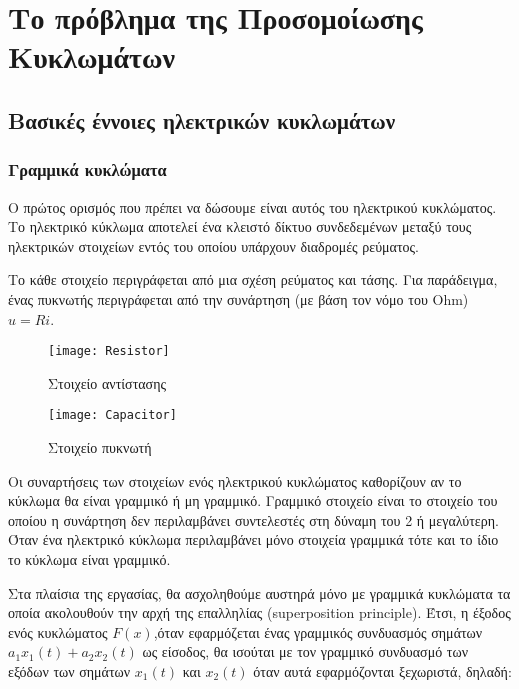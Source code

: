 ﻿
\chapter{Το πρόβλημα της Προσομοίωσης Κυκλωμάτων}
\label{ch:2.chapterCircuitSimulationPrinciples}
    
\section{Βασικές έννοιες ηλεκτρικών κυκλωμάτων}

\subsection{Γραμμικά κυκλώματα}

Ο πρώτος ορισμός που πρέπει να δώσουμε είναι αυτός του ηλεκτρικού κυκλώματος. Το ηλεκτρικό κύκλωμα αποτελεί ένα κλειστό δίκτυο συνδεδεμένων μεταξύ τους ηλεκτρικών στοιχείων εντός του οποίου υπάρχουν διαδρομές ρεύματος.

Το κάθε στοιχείο περιγράφεται από μια σχέση ρεύματος και τάσης. Για παράδειγμα, ένας πυκνωτής περιγράφεται από την συνάρτηση (με βάση τον νόμο του \textlatin{Ohm}) $u = Ri$.

\begin{figure}
    \centering
    \begin{minipage}{0.45\textwidth}
        \centering
        \texttt{[image: Resistor]}
        \caption{Στοιχείο αντίστασης}
    \end{minipage}\hfill
    \begin{minipage}{0.45\textwidth}
        \centering
        \texttt{[image: Capacitor]}
        \caption{Στοιχείο πυκνωτή}
    \end{minipage}
\end{figure}


Οι συναρτήσεις των στοιχείων ενός ηλεκτρικού κυκλώματος καθορίζουν αν το κύκλωμα θα είναι γραμμικό ή μη γραμμικό. Γραμμικό στοιχείο είναι το στοιχείο του οποίου η συνάρτηση δεν περιλαμβάνει συντελεστές στη δύναμη του 2 ή μεγαλύτερη.
Όταν ένα ηλεκτρικό κύκλωμα περιλαμβάνει μόνο στοιχεία γραμμικά τότε και το ίδιο το κύκλωμα είναι γραμμικό.

Στα πλαίσια της εργασίας, θα ασχοληθούμε αυστηρά μόνο με γραμμικά κυκλώματα τα οποία ακολουθούν την αρχή της επαλληλίας (\textlatin{superposition principle}).  Έτσι, η έξοδος ενός κυκλώματος $F(x)$,όταν εφαρμόζεται ένας γραμμικός συνδυασμός σημάτων $a_1x_1(t) + a_2x_2(t)$ ως είσοδος, θα ισούται με τον γραμμικό συνδυασμό των εξόδων των σημάτων $x_1(t)$ και $x_2(t)$ όταν αυτά εφαρμόζονται ξεχωριστά, δηλαδή:


